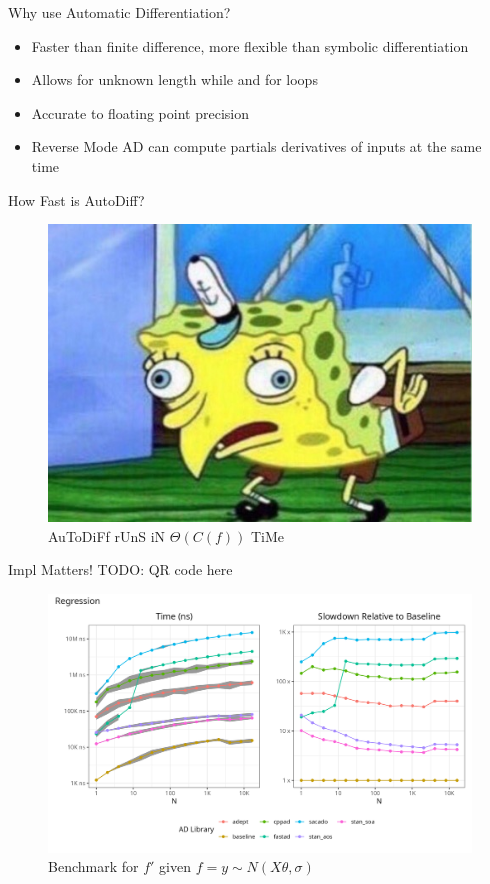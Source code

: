 \documentclass[dvipsnames]{beamer}
\begin{document}
\begin{frame}{Why use Automatic Differentiation?}
\begin{itemize}
\item Faster than finite difference, more flexible than symbolic differentiation
\item Allows for unknown length while and for loops
\item Accurate to floating point precision
\item Reverse Mode AD can compute partials derivatives of inputs at the same time
\end{itemize}
\end{frame}

\begin{frame}{How Fast is AutoDiff?}
\begin{figure}
\centerline{\includegraphics[scale=.5]{img/mocking-spongebob.jpg}}
\caption{AuToDiFf rUnS iN $\Theta(C(f))$ TiMe}
\label{fig-spongebob}
\end{figure}
\end{frame}

\begin{frame}{Impl Matters!}
  TODO: QR code here
\begin{figure}
\centerline{\includegraphics[scale=.5]{img/combined_regression_plot.png}}
\caption{Benchmark for $f'$ given $f = y\sim N(X\theta,\sigma)$}
\label{fig-red-bench}
\end{figure}
\end{frame}
\end{document}
